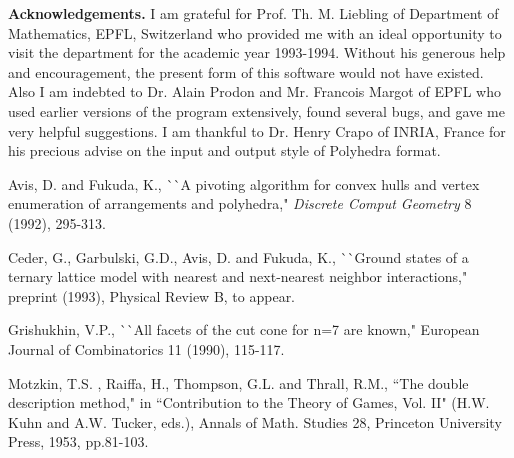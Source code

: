 \bigskip
\noindent
{\large {\bf Acknowledgements.}} 
I am  grateful for Prof. Th. M. Liebling of
Department of Mathematics, EPFL, Switzerland who
provided me with an ideal opportunity to visit the department
for the academic year 1993-1994.  Without his 
generous help and encouragement,
the present form of this software would not have existed.
Also I am indebted to Dr. Alain Prodon and Mr. Francois Margot
of EPFL who used earlier versions of the program extensively,
found several bugs, and  gave me very helpful suggestions.
I am thankful to Dr. Henry Crapo of INRIA, France for
his precious advise on the input and output style of Polyhedra format.

\addtolength{\baselineskip}{-0.5\baselineskip}
\begin{thebibliography}{99}
 Avis, D.  and Fukuda, K., ^^ ^^ A pivoting algorithm
        for convex hulls and vertex enumeration of arrangements
        and polyhedra," {\em Discrete Comput Geometry} 8
        (1992), 295-313.

 Ceder, G., Garbulski, G.D.,  Avis, D. and Fukuda, K., 
^^ ^^ Ground states of a ternary lattice model with nearest
and next-nearest neighbor interactions," preprint  (1993),
Physical Review B, to appear.

 Grishukhin, V.P., ^^ ^^ All facets of
the cut cone for n=7 are known," European Journal of
Combinatorics 11 (1990), 115-117.

 Motzkin, T.S. , Raiffa, H.,  Thompson, G.L. and  Thrall, R.M., ``The double
description method," in  ``Contribution to the Theory of Games, Vol. II"
(H.W. Kuhn and A.W. Tucker, eds.),
Annals of Math. Studies 28,  Princeton University Press, 1953, pp.81-103.

\end{thebibliography}



